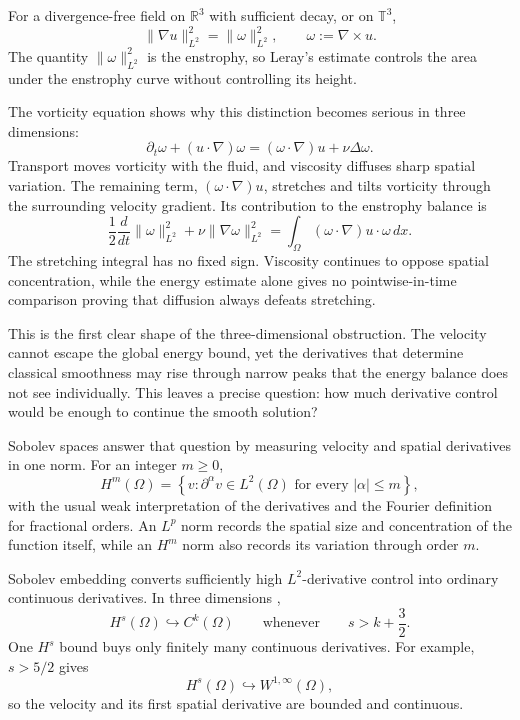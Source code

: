 
For a divergence-free field on \(\mathbb R^3\) with sufficient decay, or on \(\mathbb T^3\),
\[
  \lVert\nabla u\rVert_{L^2}^{2}
  =
  \lVert\omega\rVert_{L^2}^{2},
  \qquad
  \omega:=\nabla\times u.
\]
The quantity \(\lVert\omega\rVert_{L^2}^{2}\) is the enstrophy, so Leray's estimate controls the area under the enstrophy curve without controlling its height.

The vorticity equation shows why this distinction becomes serious in three dimensions:
\[
  \partial_t\omega+(u\cdot\nabla)\omega
  =
  (\omega\cdot\nabla)u+\nu\Delta\omega.
\]
Transport moves vorticity with the fluid, and viscosity diffuses sharp spatial variation.
The remaining term, \((\omega\cdot\nabla)u\), stretches and tilts vorticity through the surrounding velocity gradient.
Its contribution to the enstrophy balance is
\[
  \frac12\frac{d}{dt}\lVert\omega\rVert_{L^2}^{2}
  +\nu\lVert\nabla\omega\rVert_{L^2}^{2}
  =
  \int_\Omega (\omega\cdot\nabla)u\cdot\omega\,dx.
\]
The stretching integral has no fixed sign.
Viscosity continues to oppose spatial concentration, while the energy estimate alone gives no pointwise-in-time comparison proving that diffusion always defeats stretching.

This is the first clear shape of the three-dimensional obstruction.
The velocity cannot escape the global energy bound, yet the derivatives that determine classical smoothness may rise through narrow peaks that the energy balance does not see individually.
This leaves a precise question: how much derivative control would be enough to continue the smooth solution?


Sobolev spaces answer that question by measuring velocity and spatial derivatives in one norm.
For an integer \(m\geq0\),
\[
  H^m(\Omega)
  =
  \left\{
    v:
    \partial^\alpha v\in L^2(\Omega)
    \text{ for every }|\alpha|\leq m
  \right\},
\]
with the usual weak interpretation of the derivatives and the Fourier definition for fractional orders.
An \(L^p\) norm records the spatial size and concentration of the function itself, while an \(H^m\) norm also records its variation through order \(m\).

Sobolev embedding converts sufficiently high \(L^2\)-derivative control into ordinary continuous derivatives.
In three dimensions \parencite[Theorem~7.28]{Cerda2010},
\[
  H^s(\Omega)\hookrightarrow C^k(\Omega)
  \qquad
  \text{whenever}
  \qquad
  s>k+\frac32.
\]
One \(H^s\) bound buys only finitely many continuous derivatives.
For example, \(s>5/2\) gives
\[
  H^s(\Omega)\hookrightarrow W^{1,\infty}(\Omega),
\]
so the velocity and its first spatial derivative are bounded and continuous.

